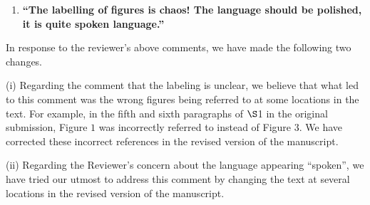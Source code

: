 \documentclass[11pt,letterpaper]{report}
\begin{document}
\begin{enumerate}[label=\textit{1.\arabic*},wide, labelwidth=!, labelindent=0pt]
\begin{enumerate}[label=\textit{2.\arabic*},wide, labelindent=0pt]


\newpage
\item \label{r2c2}{\bf ``The labelling of figures is chaos! The language should be polished, it is quite spoken language.''}
\end{enumerate}

In response to the reviewer's above comments, we have made the following two changes.

(i) Regarding the comment that the labeling is unclear, we believe that what led to this comment was the wrong figures being referred to at some locations in the text. For example, in the fifth and sixth paragraphs of $\S$1 in the original submission, Figure $1$ was incorrectly referred to instead of Figure $3$. We have corrected these incorrect references in the revised version of the manuscript.

(ii) Regarding the Reviewer's concern about the language appearing ``spoken'', we have tried our utmost to address this comment by changing the text at several locations in the revised version of the manuscript.


\end{enumerate}

\clearpage



\end{document}
